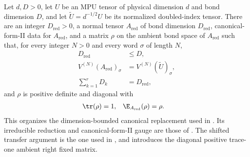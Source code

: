 \begin{lemma}
    \label{thm:mpu_reduced_normalized_flattening_cfii}
    \leanok
    Let $d,D>0$, let $U$ be an MPU tensor of physical dimension $d$ and
    bond dimension $D$, and let $\widetilde U=d^{-1/2}U$ be its normalized
    doubled-index tensor. There are an integer $D_{\mathrm{red}}>0$, a normal
    tensor $A_{\mathrm{red}}$ of bond dimension $D_{\mathrm{red}}$,
    canonical-form-II data for $A_{\mathrm{red}}$, and a matrix $\rho$ on the
    ambient bond space of $A_{\mathrm{red}}$ such that, for every
    integer $N>0$ and every word $\sigma$ of length $N$,
    \begin{align}
        D_{\mathrm{red}}  & \leq D,                        \\
        V^{(N)}(A_{\mathrm{red}})_\sigma
                          & =V^{(N)}(\widetilde U)_\sigma, \\
        \sum_{k=1}^{r}D_k & =D_{\mathrm{red}},
    \end{align}
    and $\rho$ is positive definite and diagonal with
    \begin{align}
        \tr(\rho) & =1,
                  & \E_{A_{\mathrm{red}}}(\rho) & =\rho.
        \label{eq:mpu_reduced_ambient_rho}
    \end{align}
    This organizes the dimension-bounded canonical replacement used in
    \cite[lines~257--294 and 319--326]{Cirac2017MPU}. Its irreducible
    reduction and canonical-form-II gauge are those of
    \cite[lines~195--255 and 1058--1077]{Cirac2016MPDO_arXiv}. The shifted
    transfer argument is the one used in
    \cite[lines~344--356]{Cirac2017MPU}, and \cite[lines~269--281]{Cirac2017MPU} introduces the diagonal positive trace-one
    ambient right fixed
    matrix.
\end{lemma}

